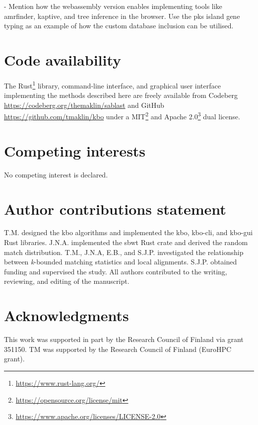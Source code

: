 \documentclass[unnumsec,webpdf,contemporary,large]{oup-authoring-template}%
\theoremstyle{thmstyleone}%
\theoremstyle{thmstyletwo}%
\theoremstyle{thmstylethree}%
\begin{document}
- Mention how the webassembly version enables implementing tools like amrfinder, kaptive, and tree inference in the browser. Use the pks island gene typing as an example of how the custom database inclusion can be utilised.

\section{Code availability}
The Rust\footnote{\url{https://www.rust-lang.org/}} library, command-line interface, and graphical user interface implementing the methods described here are freely available from Codeberg \url{https://codeberg.org/themaklin/sablast} and GitHub \url{https://github.com/tmaklin/kbo} under a MIT\footnote{\url{https://opensource.org/license/mit}} and Apache 2.0\footnote{\url{https://www.apache.org/licenses/LICENSE-2.0}} dual license.

\section{Competing interests}
No competing interest is declared.

\section{Author contributions statement}
T.M. designed the kbo algorithms and implemented the kbo, kbo-cli, and kbo-gui Rust libraries. J.N.A. implemented the sbwt Rust crate and derived the random match distribution. T.M., J.N.A, E.B., and S.J.P. investigated the relationship between \emph{k}-bounded matching statistics and local alignments. S.J.P. obtained funding and supervised the study. All authors contributed to the writing, reviewing, and editing of the manuscript.

\section{Acknowledgments}
This work was supported in part by the Research Council of Finland via grant 351150. TM was supported by the Research Council of Finland (EuroHPC grant).






%
%
\end{document}
